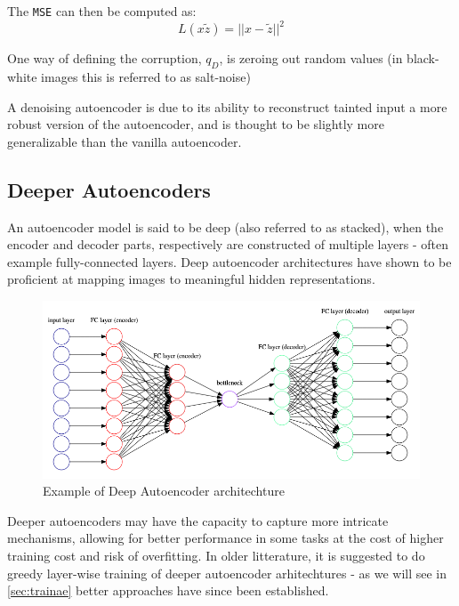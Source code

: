The \texttt{MSE} can then be computed as:
$$
L(x\widetilde{z}) = ||x-\widetilde{z}||^{2}
$$

One way of defining the corruption, $q_{D}$, is zeroing out random values\autocite{Vincent2008} (in black-white images this is referred to as salt-noise) 

A denoising autoencoder is due to its ability to reconstruct tainted input a more robust version of the autoencoder, and is thought to be slightly more generalizable than the vanilla autoencoder.

\subsection{Deeper Autoencoders}
An autoencoder model is said to be deep (also referred to as stacked), when the encoder and decoder parts, respectively are constructed of multiple layers - often example fully-connected layers. 
Deep autoencoder architectures have shown to be proficient at mapping images to meaningful hidden representations\autocite{Krizhevsky2010}. 

\begin{figure}[H]
    \centering
    \includegraphics[scale=0.4]{pictures/graphviz/autoencoder_deep}
    \caption{Example of Deep Autoencoder architechture}
    \label{fig:deepautoencoder}
\end{figure}

Deeper autoencoders may have the capacity to capture more intricate mechanisms, allowing for better performance in some tasks at the cost of higher training cost and risk of overfitting. 
In older litterature, it is suggested to do greedy layer-wise training of deeper autoencoder arhitechtures - as we will see in \autoref{sec:trainae} better approaches have since been established.
\newline



